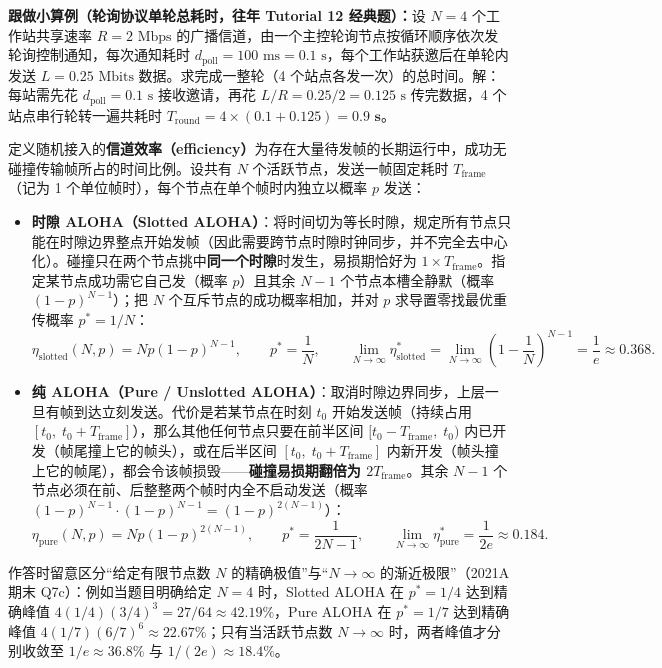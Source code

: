 \textbf{跟做小算例（轮询协议单轮总耗时，往年 Tutorial 12 经典题）：}设 $N = 4$ 个工作站共享速率 $R = 2\text{ Mbps}$ 的广播信道，由一个主控轮询节点按循环顺序依次发轮询控制通知，每次通知耗时 $d_{\mathrm{poll}} = 100\text{ ms} = 0.1\text{ s}$，每个工作站获邀后在单轮内发送 $L = 0.25\text{ Mbits}$ 数据。求完成一整轮（4 个站点各发一次）的总时间。解：每站需先花 $d_{\mathrm{poll}} = 0.1\text{ s}$ 接收邀请，再花 $L/R = 0.25 / 2 = 0.125\text{ s}$ 传完数据，4 个站点串行轮转一遍共耗时 $T_{\mathrm{round}} = 4 \times (0.1 + 0.125) = \mathbf{0.9\text{ s}}$。


定义随机接入的\textbf{信道效率（efficiency）}为存在大量待发帧的长期运行中，成功无碰撞传输帧所占的时间比例。设共有 $N$ 个活跃节点，发送一帧固定耗时 $T_{\mathrm{frame}}$（记为 1 个单位帧时），每个节点在单个帧时内独立以概率 $p$ 发送：
\begin{itemize}
\item \textbf{时隙 ALOHA（Slotted ALOHA）}：将时间切为等长时隙，规定所有节点只能在时隙边界整点开始发帧（因此需要跨节点时隙时钟同步，并不完全去中心化）。碰撞只在两个节点挑中\textbf{同一个时隙}时发生，易损期恰好为 $1\times T_{\mathrm{frame}}$。指定某节点成功需它自己发（概率 $p$）且其余 $N-1$ 个节点本槽全静默（概率 $(1-p)^{N-1}$）；把 $N$ 个互斥节点的成功概率相加，并对 $p$ 求导置零找最优重传概率 $p^* = 1/N$：
\[
\eta_{\mathrm{slotted}}(N, p) = N p (1-p)^{N-1}, \qquad p^* = \frac{1}{N}, \qquad \lim_{N\to\infty}\eta_{\mathrm{slotted}}^* = \lim_{N\to\infty}\left(1 - \frac{1}{N}\right)^{N-1} = \frac{1}{e} \approx 0.368.
\tag{6.2}
\]
\item \textbf{纯 ALOHA（Pure / Unslotted ALOHA）}：取消时隙边界同步，上层一旦有帧到达立刻发送。代价是若某节点在时刻 $t_0$ 开始发送帧（持续占用 $[t_0,\; t_0 + T_{\mathrm{frame}}]$），那么其他任何节点只要在前半区间 $[t_0 - T_{\mathrm{frame}},\; t_0)$ 内已开发（帧尾撞上它的帧头），或在后半区间 $[t_0,\; t_0 + T_{\mathrm{frame}}]$ 内新开发（帧头撞上它的帧尾），都会令该帧损毁——\textbf{碰撞易损期翻倍为 $2 T_{\mathrm{frame}}$}。其余 $N-1$ 个节点必须在前、后整整两个帧时内全不启动发送（概率 $(1-p)^{N-1}\cdot(1-p)^{N-1} = (1-p)^{2(N-1)}$）：
\[
\eta_{\mathrm{pure}}(N, p) = N p (1-p)^{2(N-1)}, \qquad p^* = \frac{1}{2N-1}, \qquad \lim_{N\to\infty}\eta_{\mathrm{pure}}^* = \frac{1}{2e} \approx 0.184.
\tag{6.3}
\]
\end{itemize}

作答时留意区分“给定有限节点数 $N$ 的精确极值”与“$N\to\infty$ 的渐近极限”（2021A 期末 Q7c）：例如当题目明确给定 $N = 4$ 时，Slotted ALOHA 在 $p^* = 1/4$ 达到精确峰值 $4(1/4)(3/4)^3 = 27/64 \approx \mathbf{42.19\%}$，Pure ALOHA 在 $p^* = 1/7$ 达到精确峰值 $4(1/7)(6/7)^6 \approx \mathbf{22.67\%}$；只有当活跃节点数 $N\to\infty$ 时，两者峰值才分别收敛至 $1/e \approx 36.8\%$ 与 $1/(2e) \approx 18.4\%$。

